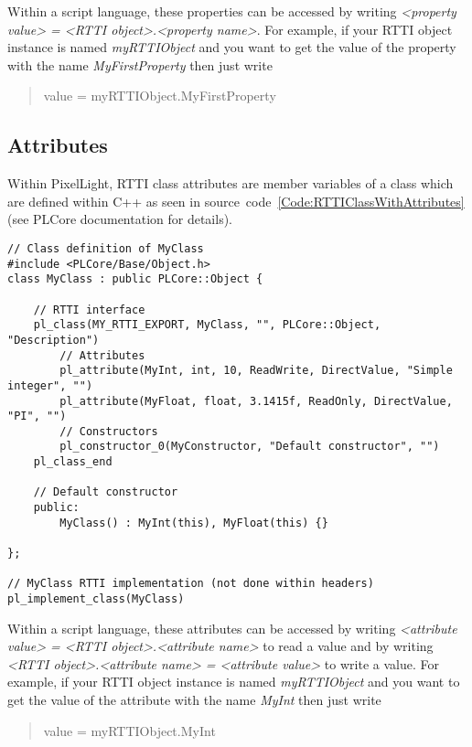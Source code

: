 Within a script language, these properties can be accessed by writing \emph{<property value> = <RTTI object>.<property name>}. For example, if your \ac{RTTI} object instance is named \emph{myRTTIObject} and you want to get the value of the property with the name \emph{MyFirstProperty} then just write \begin{quote}value = myRTTIObject.MyFirstProperty\end{quote}


\subsection{Attributes}
Within PixelLight, \ac{RTTI} class attributes are member variables of a class which are defined within C++ as seen in source~code~\ref{Code:RTTIClassWithAttributes} (see PLCore documentation for details).
\begin{lstlisting}[label=Code:RTTIClassWithAttributes,caption={Defining a new \ac{RTTI} class with attributes (C++)}]
// Class definition of MyClass
#include <PLCore/Base/Object.h>
class MyClass : public PLCore::Object {

	// RTTI interface
	pl_class(MY_RTTI_EXPORT, MyClass, "", PLCore::Object, "Description")
		// Attributes
		pl_attribute(MyInt, int, 10, ReadWrite, DirectValue, "Simple integer", "")
		pl_attribute(MyFloat, float, 3.1415f, ReadOnly, DirectValue, "PI", "")
		// Constructors
		pl_constructor_0(MyConstructor, "Default constructor", "")
	pl_class_end

	// Default constructor
	public:
		MyClass() : MyInt(this), MyFloat(this) {}

};

// MyClass RTTI implementation (not done within headers)
pl_implement_class(MyClass)
\end{lstlisting}

Within a script language, these attributes can be accessed by writing \emph{<attribute value> = <RTTI object>.<attribute name>} to read a value and by writing \emph{<RTTI object>.<attribute name> = <attribute value>} to write a value. For example, if your \ac{RTTI} object instance is named \emph{myRTTIObject} and you want to get the value of the attribute with the name \emph{MyInt} then just write \begin{quote}value = myRTTIObject.MyInt\end{quote}


